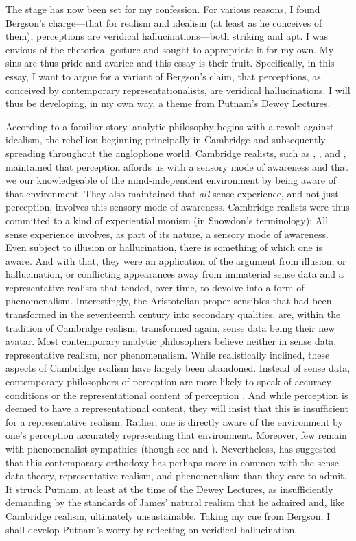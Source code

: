 \documentclass[12pt]{article}
\begin{document}
The stage has now been set for my confession. For various reasons, I found Bergson's charge---that for realism and idealism (at least as he conceives of them), perceptions are veridical hallucinations---both striking and apt. I was envious of the rhetorical gesture and sought to appropriate it for my own. My sins are thus pride and avarice and this essay is their fruit. Specifically, in this essay, I want to argue for a variant of Bergson's claim, that perceptions, as conceived by contemporary representationalists, are veridical hallucinations. I will thus be developing, in my own way, a theme from Putnam's Dewey Lectures.

According to a familiar story, analytic philosophy begins with a revolt against idealism, the rebellion beginning principally in Cambridge and subsequently spreading throughout the anglophone world. Cambridge realists, such as \cite{Russell:1912uq}, \citet{Moore:1953nx}, and \citet{Price:1932fk}, maintained that perception affords us with a sensory mode of awareness and that we our knowledgeable of the mind-independent environment by being aware of that environment. They also maintained that \emph{all} sense experience, and not just perception, involves this sensory mode of awareness. Cambridge realists were thus committed to a kind of experiential monism (in Snowdon's \citeyear{Snowdon:2008oz} terminology): All sense experience involves, as part of its nature, a sensory mode of awareness. Even subject to illusion or hallucination, there is something of which one is aware. And with that, they were an application of the argument from illusion, or hallucination, or conflicting appearances away from immaterial sense data and a representative realism that tended, over time, to devolve into a form of phenomenalism. Interestingly, the Aristotelian proper sensibles that had been transformed in the seventeenth century into secondary qualities, are, within the tradition of Cambridge realism, transformed again, sense data being their new avatar. Most contemporary analytic philosophers believe neither in sense data, representative realism, nor phenomenalism. While realistically inclined, these aspects of Cambridge realism have largely been abandoned. Instead of sense data, contemporary philosophers of perception are more likely to speak of accuracy conditions or the representational content of perception \citep[though see][]{Robinson:1994ms}. And while perception is deemed to have a representational content, they will insist that this is insufficient for a representative realism. Rather, one is directly aware of the environment by one's perception accurately representing that environment. Moreover, few remain with phenomenalist sympathies (though see \citealt{Foster:2000ny} and \citealt{Noe:2004fk}). Nevertheless, \citet{Putnam:1994kx} has suggested that this contemporary orthodoxy has perhaps more in common with the sense-data theory, representative realism, and phenomenalism than they care to admit. It struck Putnam, at least at the time of the Dewey Lectures, as insufficiently demanding by the standards of James' natural realism that he admired and, like Cambridge realism, ultimately unsustainable. Taking my cue from Bergson, I shall develop Putnam's worry by reflecting on veridical hallucination.
\end{document}
